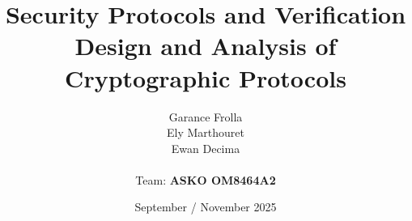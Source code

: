 \documentclass[11pt]{article}
\begin{document}
    \title{
            { \textbf{Security Protocols and Verification}} \\[1ex]
        {\small Design and Analysis of Cryptographic Protocols}
    }


    \author{
        Garance Frolla \\
        Ely Marthouret \\
        Ewan Decima\\ \\
        Team: \textbf{ASKO OM8464A2}
    }

    \date{September / November 2025}


    \maketitle
    \tableofcontents
    \newpage


    
    
    
    
    
\end{document}

